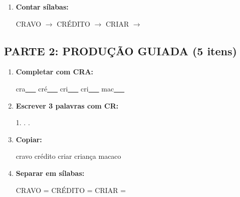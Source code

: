 \begin{exercicio}
\begin{enumerate}
  \item \textbf{Contar sílabas:}
  \begin{center}
  CRAVO $\rightarrow$ \underline{\hspace{0.9cm}} \quad CRÉDITO $\rightarrow$ \underline{\hspace{0.9cm}} \quad CRIAR $\rightarrow$ \underline{\hspace{0.9cm}}
  \end{center}

\end{enumerate}

\subsection*{PARTE 2: PRODUÇÃO GUIADA (5 itens)}

\begin{enumerate}[resume]

  \item \textbf{Completar com CRA:}
  \begin{center}
  cra\underline{~~~} \quad cré\underline{~~~} \quad cri\underline{~~~} \quad cri\underline{~~~} \quad mac\underline{~~~}
  \end{center}

  \item \textbf{Escrever 3 palavras com CR:}
  \begin{center}
  1. \underline{\hspace{3cm}} . \underline{\hspace{3cm}} . \underline{\hspace{3cm}}
  \end{center}

  \item \textbf{Copiar:}
  \begin{center}
  cravo \quad crédito \quad criar \quad criança \quad macaco
  \end{center}

  \item \textbf{Separar em sílabas:}
  \begin{center}
  CRAVO = \underline{\hspace{1cm}} \underline{\hspace{1cm}} \quad CRÉDITO = \underline{\hspace{1cm}} \underline{\hspace{1cm}} \quad CRIAR = \underline{\hspace{1cm}} \underline{\hspace{1cm}}
  \end{center}


\end{enumerate}
\end{exercicio}
